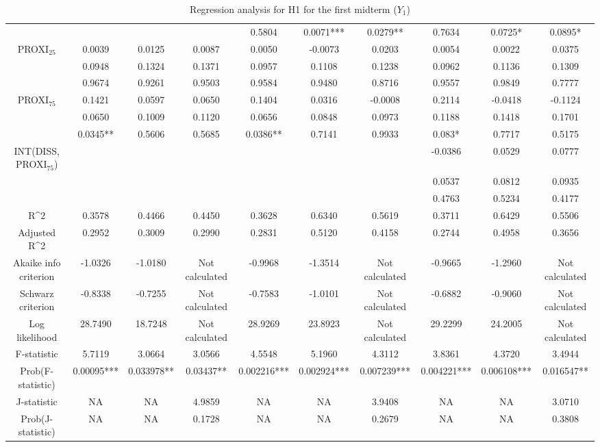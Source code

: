 \documentclass[]{article}
\begin{document}
\begin{landscape}
\begin{table}[htp]
\begin{adjustbox}{height=0.55\textheight,width=1.6\textwidth}
\begin{tabular}{c|ccc|ccc|ccc}
					&  &  &  & 0.5804 & 0.0071*** & 0.0279** & 0.7634 & 0.0725* & 0.0895* \\
					PROXI$_{25}$ & 0.0039 & 0.0125 & 0.0087 & 0.0050 & -0.0073 & 0.0203 & 0.0054 & 0.0022 & 0.0375 \\
					& 0.0948 & 0.1324 & 0.1371 & 0.0957 & 0.1108 & 0.1238 & 0.0962 & 0.1136 & 0.1309 \\
					& 0.9674 & 0.9261 & 0.9503 & 0.9584 & 0.9480 & 0.8716 & 0.9557 & 0.9849 & 0.7777 \\
					PROXI$_{75}$ & 0.1421 & 0.0597 & 0.0650 & 0.1404 & 0.0316 & -0.0008 & 0.2114 & -0.0418 & -0.1124 \\
					& 0.0650 & 0.1009 & 0.1120 & 0.0656 & 0.0848 & 0.0973 & 0.1188 & 0.1418 & 0.1701 \\
					& 0.0345** & 0.5606 & 0.5685 & 0.0386** & 0.7141 & 0.9933 & 0.083* & 0.7717 & 0.5175 \\
					INT(DISS, PROXI$_{75}$) &  &  &  &  &  &  & -0.0386 & 0.0529 & 0.0777 \\
					&  &  &  &  &  &  & 0.0537 & 0.0812 & 0.0935 \\
					&  &  &  &  &  &  & 0.4763 & 0.5234 & 0.4177 \\
					\hline
					R\^{}2 & 0.3578 & 0.4466 & 0.4450 & 0.3628 & 0.6340 & 0.5619 & 0.3711 & 0.6429 & 0.5506 \\
					Adjusted R\^{}2 & 0.2952 & 0.3009 & 0.2990 & 0.2831 & 0.5120 & 0.4158 & 0.2744 & 0.4958 & 0.3656 \\
					Akaike info criterion & -1.0326 & -1.0180 & Not calculated & -0.9968 & -1.3514 & Not calculated & -0.9665 & -1.2960 & Not calculated \\
					Schwarz criterion & -0.8338 & -0.7255 & Not calculated & -0.7583 & -1.0101 & Not calculated & -0.6882 & -0.9060 & Not calculated \\
					Log likelihood & 28.7490 & 18.7248 & Not calculated & 28.9269 & 23.8923 & Not calculated & 29.2299 & 24.2005 & Not calculated \\
					\hline
					F-statistic & 5.7119 & 3.0664 & 3.0566 & 4.5548 & 5.1960 & 4.3112 & 3.8361 & 4.3720 & 3.4944 \\
					Prob(F-statistic) & 0.00095*** & 0.033978** & 0.03437** & 0.002216*** & 0.002924*** & 0.007239*** & 0.004221*** & 0.006108*** & 0.016547** \\
					J-statistic & NA & NA & 4.9859 & NA & NA & 3.9408 & NA & NA & 3.0710 \\
					Prob(J-statistic) & NA & NA & 0.1728 & NA & NA & 0.2679 & NA & NA & 0.3808 \\
					\hline
				\end{tabular}
			\end{adjustbox}
			\caption{Regression analysis for H1 for the first midterm ($Y_1$)}  
		\end{table} 
	\end{landscape}
	
\end{document}
